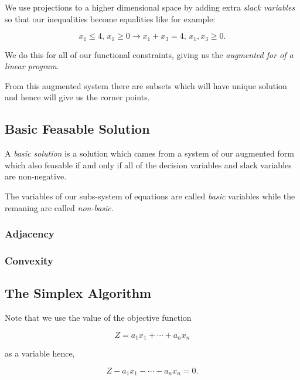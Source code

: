 We use projections to a higher dimensional space by adding extra \emph{slack variables} so that our inequalities become equalities like for example:

\[
	x_1 \le 4,\,  x_1 \ge 0 \to x_1 + x_3 = 4, \, x_1, x_3 \ge 0.
\]

We do this for all of our functional constraints, giving us the \emph{augmented for of a linear program}.

From this augmented system there are subsets which will have unique solution and hence will give us the corner points.

\subsection{Basic Feasable Solution}

A \emph{basic solution} is a solution which cames from a system of our augmented form which also feasable if and only if all of the decision variables and slack
variables are non-negative.

The variables of our subs-system of equations are called \emph{basic} variables while the remaning are called \emph{non-basic}.

\subsubsection{Adjacency}


\subsubsection{Convexity}


\subsection{The Simplex Algorithm}

Note that we use the value of the objective function

\[
	Z =  a_1 x_1 + \cdots + a_n x_n
\]

as a variable hence,

\[
	Z - a_1 x_1 - \cdots - a_n x_n = 0.
\]

